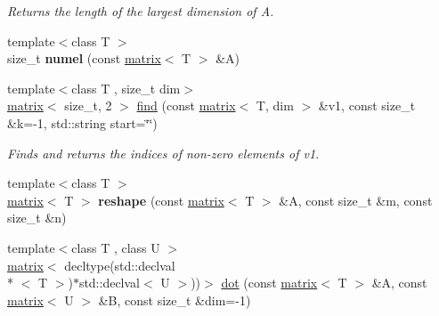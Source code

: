 \begin{DoxyCompactItemize}
\begin{DoxyCompactList}\small\item\em Returns the length of the largest dimension of A. \end{DoxyCompactList}\item 
\hypertarget{namespacekeycpp_adcbcd3d38aa0721f2556422eb06cad7d}{{\footnotesize template$<$class T $>$ }\\size\-\_\-t {\bfseries numel} (const \hyperlink{classkeycpp_1_1matrix}{matrix}$<$ T $>$ \&A)}\label{namespacekeycpp_adcbcd3d38aa0721f2556422eb06cad7d}

\item 
\hypertarget{namespacekeycpp_a1ff2731f68b07dddedc5d572a409ba9e}{{\footnotesize template$<$class T , size\-\_\-t dim$>$ }\\\hyperlink{classkeycpp_1_1matrix}{matrix}$<$ size\-\_\-t, 2 $>$ \hyperlink{namespacekeycpp_a1ff2731f68b07dddedc5d572a409ba9e}{find} (const \hyperlink{classkeycpp_1_1matrix}{matrix}$<$ T, dim $>$ \&v1, const size\-\_\-t \&k=-\/1, std\-::string start=\char`\"{}\char`\"{})}\label{namespacekeycpp_a1ff2731f68b07dddedc5d572a409ba9e}

\begin{DoxyCompactList}\small\item\em Finds and returns the indices of non-\/zero elements of v1. \end{DoxyCompactList}\item 
\hypertarget{namespacekeycpp_a8e6462a878df6e022bd4f9aa6f953983}{{\footnotesize template$<$class T $>$ }\\\hyperlink{classkeycpp_1_1matrix}{matrix}$<$ T $>$ {\bfseries reshape} (const \hyperlink{classkeycpp_1_1matrix}{matrix}$<$ T $>$ \&A, const size\-\_\-t \&m, const size\-\_\-t \&n)}\label{namespacekeycpp_a8e6462a878df6e022bd4f9aa6f953983}

\item 
\hypertarget{namespacekeycpp_a67c6ec70ba46d1d830acf7fbf8b8b97e}{{\footnotesize template$<$class T , class U $>$ }\\\hyperlink{classkeycpp_1_1matrix}{matrix}$<$ decltype(std\-::declval\\*
$<$ T $>$)$\ast$std\-::declval$<$ U $>$))$>$ \hyperlink{namespacekeycpp_a67c6ec70ba46d1d830acf7fbf8b8b97e}{dot} (const \hyperlink{classkeycpp_1_1matrix}{matrix}$<$ T $>$ \&A, const \hyperlink{classkeycpp_1_1matrix}{matrix}$<$ U $>$ \&B, const size\-\_\-t \&dim=-\/1)}\label{namespacekeycpp_a67c6ec70ba46d1d830acf7fbf8b8b97e}


\end{DoxyCompactItemize}
